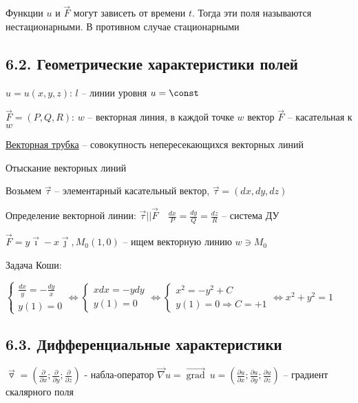 \documentclass[12pt]{article}
\begin{document}
    \Notas Функции $u$ и $\vec{F}$ могут зависеть от времени $t$. Тогда эти поля называются нестационарными. В противном случае стационарными

    \hypertarget{scalarandvectorfieldgeometric}{}

    \subsection{6.2. Геометрические характеристики полей}

    $u = u(x, y, z)$: $l$ -- линии уровня $u = \const$

    $\vec{F} = (P, Q, R)$: $w$ -- векторная линия, в каждой точке $w$ вектор $\vec{F}$ -- касательная к $w$

    \underline{Векторная трубка} -- совокупность непересекающихся векторных линий

    \Nota Отыскание векторных линий

    Возьмем $\vec{\tau}$ -- элементарный касательный вектор, $\vec{\tau} = (dx, dy, dz)$

    Определение векторной линии: $\vec{\tau} || \vec{F} \quad \frac{dx}{P} = \frac{dy}{Q} = \frac{dz}{R}$ -- система ДУ

    \Ex $\vec{F} = y \vec\imath - x \vec\jmath, M_0 (1, 0)$ -- ищем векторную линию $w \ni M_0$

    Задача Коши:

    $\begin{cases}
        \frac{dx}{y} = -\frac{dy}{x} \\ y(1) = 0
    \end{cases} \Longleftrightarrow \begin{cases}
        xdx = -ydy \\ y(1) = 0
    \end{cases} \Longleftrightarrow \begin{cases}
        x^2 = -y^2 + C \\ y(1) = 0 \Longrightarrow C = +1
    \end{cases} \Longleftrightarrow x^2 + y^2 = 1 $

    \hypertarget{differentialcharacteristics}{}

    \subsection{6.3. Дифференциальные характеристики}

    $\overrightarrow{\triangledown} = \left(\frac{\partial}{\partial x}; \frac{\partial}{\partial y}; \frac{\partial}{\partial z}\right)$ - набла-оператор
    \Mems $\vec\nabla u = \overrightarrow{\operatorname{grad}} \ u = \left(\frac{\partial u}{\partial x}; \frac{\partial u}{\partial y}; \frac{\partial u}{\partial z}\right)$ -- градиент скалярного поля
\end{document}
